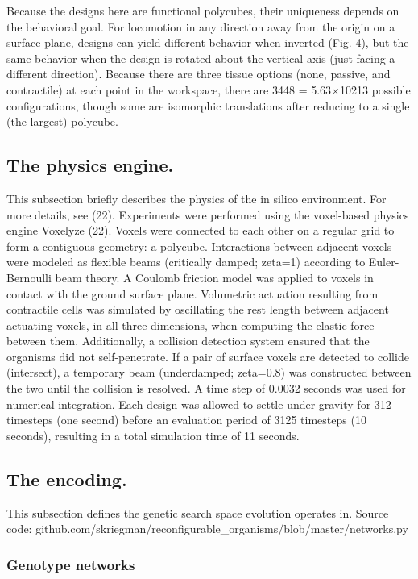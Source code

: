 Because the designs here are functional polycubes, their uniqueness depends on the behavioral goal. For locomotion in any direction away from the origin on a surface plane, designs can yield different behavior when inverted (Fig. 4), but the same behavior when the design is rotated about the vertical axis (just facing a different direction). Because there are three tissue options (none, passive, and contractile) at each point in the workspace, there are 3448 = 5.63{$\times$}10213 possible configurations, though some are isomorphic translations after reducing to a single (the largest) polycube.


\subsection*{The physics engine.}

This subsection briefly describes the physics of the in silico environment. 
For more details, see (22).
Experiments were performed using the voxel-based physics engine Voxelyze (22). 
Voxels were connected to each other on a regular grid to form a contiguous geometry: a polycube. 
Interactions between adjacent voxels were modeled as flexible beams (critically damped; zeta=1) according to Euler-Bernoulli beam theory. 
A Coulomb friction model was applied to voxels in contact with the ground surface plane. 
Volumetric actuation resulting from contractile cells was simulated by oscillating the rest length between adjacent actuating voxels, in all three dimensions, when computing the elastic force between them.
Additionally, a collision detection system ensured that the organisms did not self-penetrate. 
If a pair of surface voxels are detected to collide (intersect), a temporary beam (underdamped; zeta=0.8) was constructed between the two until the collision is resolved. 
A time step of 0.0032 seconds was used for numerical integration. Each design was allowed to settle under gravity for 312 timesteps (one second) before an evaluation period of 3125 timesteps (10 seconds), resulting in a total simulation time of 11 seconds.


\subsection*{The encoding.}

This subsection defines the genetic search space evolution operates in. Source code: github.com/skriegman/reconfigurable\_organisms/blob/master/networks.py


\subsubsection*{Genotype networks}

